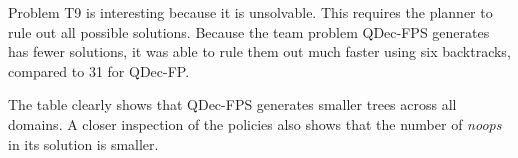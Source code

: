\documentclass[letterpaper]{article} %
\theoremstyle{definition}
\begin{document}




Problem T9 is interesting because it is unsolvable.
This requires the planner to rule out all possible solutions. Because the team problem QDec-FPS generates has fewer solutions, it was able to
rule them out much faster
using six backtracks, compared to 31 for QDec-FP.

The table clearly shows that QDec-FPS generates smaller trees across all domains. A closer inspection of the policies also shows that the number of {\em noops} in its solution is smaller.
\end{document}
